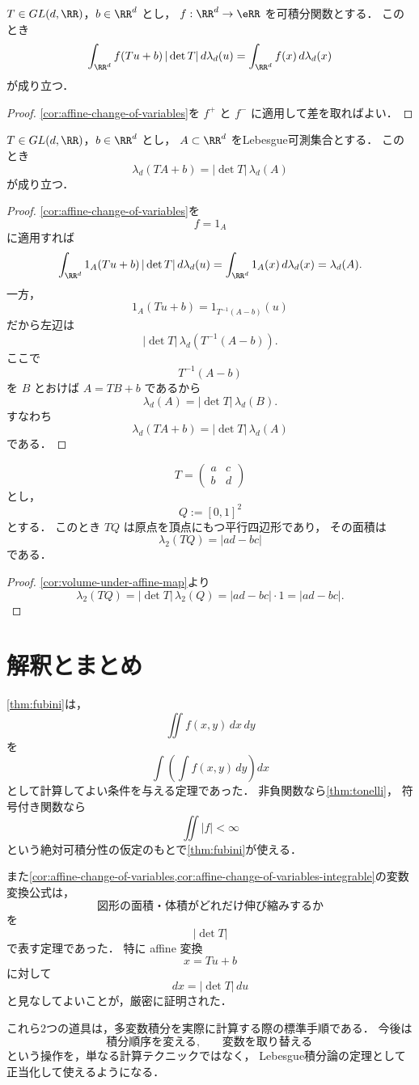 \begin{corollary}\label{cor:affine-change-of-variables-integrable}
$T\in GL(d,\RR)$，$b\in\RR^d$ とし，
$f:\RR^d\to\eRR$ を可積分関数とする．
このとき
\[
\int_{\RR^d}f(Tu+b)\,|\det T|\,d\lambda_d(u)
=
\int_{\RR^d}f(x)\,d\lambda_d(x)
\]
が成り立つ．
\end{corollary}
\begin{proof}
\cref{cor:affine-change-of-variables}を $f^+$ と $f^-$ に適用して差を取ればよい．
\end{proof}

\begin{corollary}[集合の体積の変換]\label{cor:volume-under-affine-map}
$T\in GL(d,\RR)$，$b\in\RR^d$ とし，
$A\subset\RR^d$ をLebesgue可測集合とする．
このとき
\[
\lambda_d(TA+b)=|\det T|\,\lambda_d(A)
\]
が成り立つ．
\end{corollary}
\begin{proof}
\cref{cor:affine-change-of-variables}を
\[
f=1_A
\]
に適用すれば
\[
\int_{\RR^d}1_A(Tu+b)\,|\det T|\,d\lambda_d(u)
=
\int_{\RR^d}1_A(x)\,d\lambda_d(x)
=
\lambda_d(A).
\]
一方，
\[
1_A(Tu+b)=1_{T^{-1}(A-b)}(u)
\]
だから左辺は
\[
|\det T|\,\lambda_d(T^{-1}(A-b)).
\]
ここで
\[
T^{-1}(A-b)
\]
を $B$ とおけば $A=TB+b$ であるから
\[
\lambda_d(A)=|\det T|\,\lambda_d(B).
\]
すなわち
\[
\lambda_d(TA+b)=|\det T|\,\lambda_d(A)
\]
である．
\end{proof}

\begin{example}[平行四辺形の面積]
\[
T=
\begin{pmatrix}
a & c\\
b & d
\end{pmatrix}
\]
とし，
\[
Q:=[0,1]^2
\]
とする．
このとき $TQ$ は原点を頂点にもつ平行四辺形であり，
その面積は
\[
\lambda_2(TQ)=|ad-bc|
\]
である．
\end{example}
\begin{proof}
\cref{cor:volume-under-affine-map}より
\[
\lambda_2(TQ)=|\det T|\,\lambda_2(Q)=|ad-bc|\cdot 1=|ad-bc|.
\]
\end{proof}

\section{解釈とまとめ}

\cref{thm:fubini}は，
\[
\iint f(x,y)\,dx\,dy
\]
を
\[
\int\left(\int f(x,y)\,dy\right)dx
\]
として計算してよい条件を与える定理であった．
非負関数なら\cref{thm:tonelli}，
符号付き関数なら
\[
\iint |f|<\infty
\]
という絶対可積分性の仮定のもとで\cref{thm:fubini}が使える．

また\cref{cor:affine-change-of-variables,cor:affine-change-of-variables-integrable}の変数変換公式は，
\[
\text{図形の面積・体積がどれだけ伸び縮みするか}
\]
を
\[
|\det T|
\]
で表す定理であった．
特に affine 変換
\[
x=Tu+b
\]
に対して
\[
dx=|\det T|\,du
\]
と見なしてよいことが，厳密に証明された．

これら2つの道具は，多変数積分を実際に計算する際の標準手順である．
今後は
\[
\text{積分順序を変える},\qquad \text{変数を取り替える}
\]
という操作を，単なる計算テクニックではなく，
Lebesgue積分論の定理として正当化して使えるようになる．
